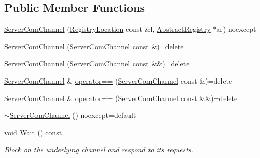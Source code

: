 \subsection*{Public Member Functions}
\begin{DoxyCompactItemize}
\item 
\hyperlink{classregistry_1_1ServerComChannel_aea787386e8aa90a93ff3e833b6f8aeb5}{Server\+Com\+Channel} (\hyperlink{structregistry_1_1RegistryLocation}{Registry\+Location} const \&l, \hyperlink{classregistry_1_1AbstractRegistry}{Abstract\+Registry} $\ast$ar) noexcept
\item 
\hyperlink{classregistry_1_1ServerComChannel_aa60633d4a141af69715188926fc1a2f7}{Server\+Com\+Channel} (\hyperlink{classregistry_1_1ServerComChannel}{Server\+Com\+Channel} const \&)=delete
\item 
\hyperlink{classregistry_1_1ServerComChannel_ac4be90169a205c3450c1962c6f3b48e3}{Server\+Com\+Channel} (\hyperlink{classregistry_1_1ServerComChannel}{Server\+Com\+Channel} const \&\&)=delete
\item 
\hyperlink{classregistry_1_1ServerComChannel}{Server\+Com\+Channel} \& \hyperlink{classregistry_1_1ServerComChannel_a730c528aa784806729190beed4dfdc4c}{operator==} (\hyperlink{classregistry_1_1ServerComChannel}{Server\+Com\+Channel} const \&)=delete
\item 
\hyperlink{classregistry_1_1ServerComChannel}{Server\+Com\+Channel} \& \hyperlink{classregistry_1_1ServerComChannel_ab83cb6ed5be5016e624d5eb7cc3cacfa}{operator==} (\hyperlink{classregistry_1_1ServerComChannel}{Server\+Com\+Channel} const \&\&)=delete
\item 
\hyperlink{classregistry_1_1ServerComChannel_a35c2375dd276e2bd18ebd1205350d898}{$\sim$\+Server\+Com\+Channel} () noexcept=default
\item 
void \hyperlink{classregistry_1_1ServerComChannel_a0e6f4848bca2c88047bb6ce75d28f335}{Wait} () const
\begin{DoxyCompactList}\small\item\em Block on the underlying channel and respond to its requests. \end{DoxyCompactList}\end{DoxyCompactItemize}
